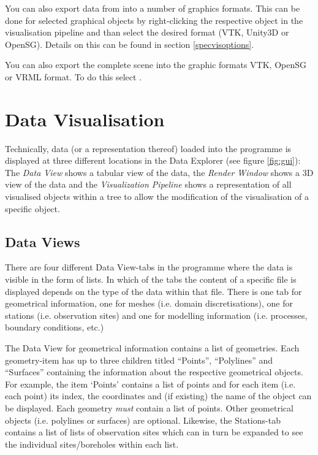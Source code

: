 \bigskip

You can also export data from \ogs into a number of graphics formats. This can be done for selected graphical objects by right-clicking the respective object in the visualisation pipeline and than select the desired format (VTK, Unity3D or OpenSG). Details on this can be found in section \ref{specvisoptions}.

You can also export the complete scene into the graphic formats VTK, OpenSG or VRML format. To do this select .

\section{Data Visualisation}
\label{datavisualisation}

Technically, data (or a representation thereof) loaded into the programme is displayed at three different locations in the Data Explorer (see figure \ref{fig:gui}): The \emph{Data View} shows a tabular view of the data, the \emph{Render Window} shows  a 3D view of the data and the \emph{Visualization Pipeline} shows a representation of all visualised objects within a tree to allow the modification of the visualisation of a specific object. 

\subsection{Data Views}

There are four different Data View-tabs in the programme where the data is visible in the form of lists. In which of the tabs the content of a specific file is displayed depends on the type of the data within that file. There is one tab for geometrical information, one for meshes (i.e. domain discretisations), one for stations (i.e. observation sites) and one for modelling information (i.e. processes, boundary conditions, etc.)

The Data View for geometrical information contains a list of geometries. Each geometry-item has up to three children titled ``Points'', ``Polylines'' and ``Surfaces'' containing the information about the respective geometrical objects. For example, the item `Points' contains a list of points and for each item (i.e. each point) its index, the coordinates and (if existing) the name of the object can be displayed. Each geometry \emph{must} contain a list of points. Other geometrical objects (i.e. polylines or surfaces) are optional. 
Likewise, the Stations-tab contains a list of lists of observation sites which can in turn be expanded to see the individual sites/boreholes within each list. 

